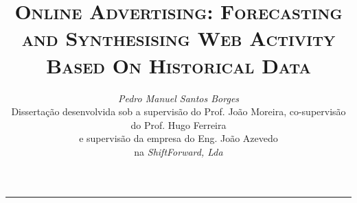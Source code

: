 \documentclass[9pt,a4paper]{extarticle}
\begin{document}
\title{\vspace*{-8mm}\textbf{\textsc{Online Advertising: Forecasting and Synthesising Web Activity Based On Historical Data}}}
\author{\emph{Pedro Manuel Santos Borges}\\[2mm]
\small{Dissertação desenvolvida sob a supervisão do Prof. João Moreira, co-supervisão do Prof. Hugo Ferreira}\\
\small{e supervisão da empresa do Eng. João Azevedo}\\
\small{na \emph{ShiftForward, Lda}}}
\date{}
\maketitle
\thispagestyle{empty}

\vspace*{-4mm}\noindent\rule{\textwidth}{0.4pt}\vspace*{4mm}
\end{document}
